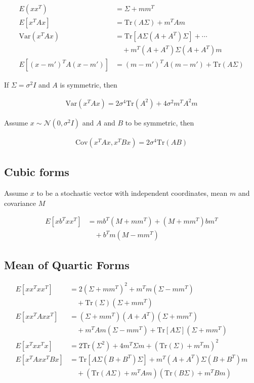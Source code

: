 \begin{align*}
E(xx^T) &= \Sigma + mm^T \tag{377} \\
E[x^TAx] &= \text{Tr}(A\Sigma) + m^TAm \tag{378} \\
\text{Var}(x^TAx) &= \text{Tr}[A\Sigma(A + A^T)\Sigma] + \cdots \tag{379} \\
&\quad +m^T(A + A^T)\Sigma(A + A^T)m \\
E[(x - m')^TA(x - m')] &= (m - m')^TA(m - m') + \text{Tr}(A\Sigma) \tag{380}
\end{align*}

If $\Sigma = \sigma^2I$ and $A$ is symmetric, then

\begin{align*}
\text{Var}(x^TAx) = 2\sigma^4\text{Tr}(A^2) + 4\sigma^2m^TA^2m \tag{381}
\end{align*}

Assume $x \sim \mathcal{N}(0, \sigma^2I)$ and $A$ and $B$ to be symmetric, then

\begin{align*}
\text{Cov}(x^TAx, x^TBx) = 2\sigma^4\text{Tr}(AB) \tag{382}
\end{align*}

\subsection{Cubic forms}

Assume $x$ to be a stochastic vector with independent coordinates, mean $m$ and covariance $M$

\begin{align*}
E[xb^Txx^T] &= mb^T(M + mm^T) + (M + mm^T)bm^T \tag{383} \\
&\quad +b^Tm(M - mm^T)
\end{align*}

\subsection{Mean of Quartic Forms}

\begin{align*}
E[xx^Txx^T] &= 2(\Sigma + mm^T)^2 + m^Tm(\Sigma - mm^T) \\
&\quad +\text{Tr}(\Sigma)(\Sigma + mm^T) \\[1em]
E[xx^TAxx^T] &= (\Sigma + mm^T)(A + A^T)(\Sigma + mm^T) \\
&\quad +m^TAm(\Sigma - mm^T) + \text{Tr}[A\Sigma](\Sigma + mm^T) \\[1em]
E[x^Txx^Tx] &= 2\text{Tr}(\Sigma^2) + 4m^T\Sigma m + (\text{Tr}(\Sigma) + m^Tm)^2 \\[1em]
E[x^TAxx^TBx] &= \text{Tr}[A\Sigma(B + B^T)\Sigma] + m^T(A + A^T)\Sigma(B + B^T)m \\
&\quad +(\text{Tr}(A\Sigma) + m^TAm)(\text{Tr}(B\Sigma) + m^TBm)
\end{align*}

